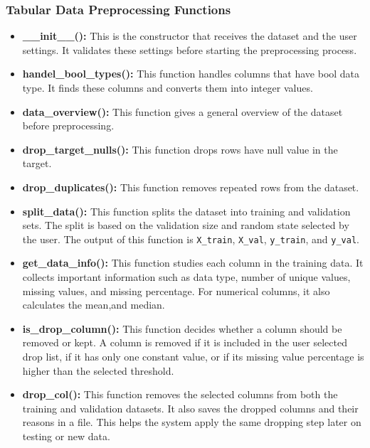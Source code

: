 \documentclass[12pt,a4paper]{report}
\begin{document}
\subsubsection{Tabular Data Preprocessing Functions}


\begin{itemize}
    \item \textbf{\_\_init\_\_():}
    This is the constructor that receives the dataset and the user settings. 
    It validates these settings before starting the preprocessing process. 
    \item \textbf{handel\_bool\_types():}
    This function handles columns that have bool data type. It finds these columns and converts them into integer values.

    \item \textbf{data\_overview():}
    This function gives a general overview of the dataset before preprocessing.
    \item \textbf{drop\_target\_nulls():}
    This function drops rows have null value in the target.

    \item \textbf{drop\_duplicates():}
    This function removes repeated rows from the dataset.

    \item \textbf{split\_data():}
    This function splits the dataset into training and validation sets. The split is
    based on the validation size and random state selected by the user. The output of
    this function is \texttt{X\_train}, \texttt{X\_val}, \texttt{y\_train}, and
    \texttt{y\_val}.

    \item \textbf{get\_data\_info():}
    This function studies each column in the training data. It collects important
    information such as data type, number of unique values,
    missing values, and missing percentage. For numerical columns, it also calculates the mean,and median.

    \item \textbf{is\_drop\_column():}
    This function decides whether a column should be removed or kept. A column is
    removed if it is included in the user selected drop list, if it has only one constant
    value, or if its missing value percentage is higher than the selected threshold. 
    \item \textbf{drop\_col():}
    This function removes the selected columns from both the training and validation
    datasets. It also saves the dropped columns and their reasons in a file. This helps
    the system apply the same dropping step later on testing or new data.


\end{itemize}
\end{document}

